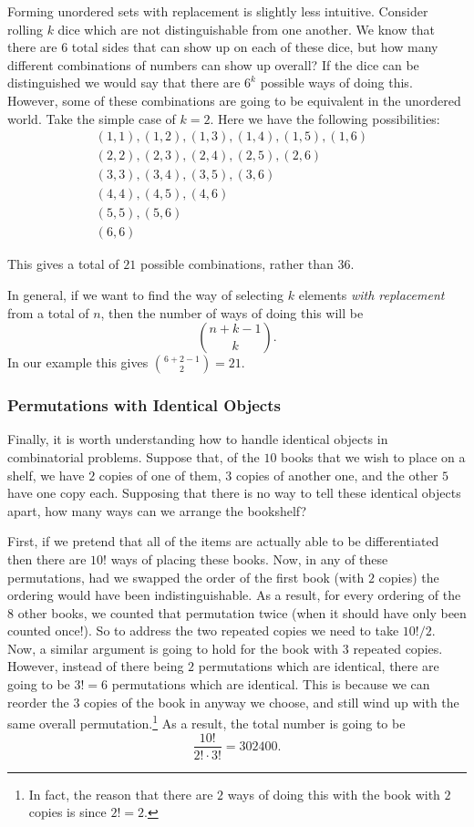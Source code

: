 \documentclass[
  letterpaper,
  DIV=11,
  numbers=noendperiod]{scrreprt}
\theoremstyle{definition}
\theoremstyle{definition}
\theoremstyle{definition}
\theoremstyle{remark}
\begin{document}
Forming unordered sets with replacement is slightly less intuitive.
Consider rolling \(k\) dice which are not distinguishable from one
another. We know that there are \(6\) total sides that can show up on
each of these dice, but how many different combinations of numbers can
show up overall? If the dice can be distinguished we would say that
there are \(6^k\) possible ways of doing this. However, some of these
combinations are going to be equivalent in the unordered world. Take the
simple case of \(k=2\). Here we have the following possibilities:
\begin{align*}
(1, 1), (1, 2), (1, 3), (1, 4), (1, 5), (1, 6)&\\ 
(2, 2), (2, 3), (2, 4), (2, 5), (2, 6)&\\ 
(3, 3), (3, 4), (3, 5), (3, 6)&\\ 
(4, 4), (4, 5), (4, 6)&\\ 
(5, 5), (5, 6)&\\ 
(6,6)&
\end{align*}

This gives a total of \(21\) possible combinations, rather than \(36\).

In general, if we want to find the way of selecting \(k\) elements
\emph{with replacement} from a total of \(n\), then the number of ways
of doing this will be \[\binom{n+k-1}{k}.\] In our example this gives
\(\binom{6+2-1}{2} = 21\).

\subsubsection{Permutations with Identical
Objects}\label{permutations-with-identical-objects}

Finally, it is worth understanding how to handle identical objects in
combinatorial problems. Suppose that, of the \(10\) books that we wish
to place on a shelf, we have \(2\) copies of one of them, \(3\) copies
of another one, and the other \(5\) have one copy each. Supposing that
there is no way to tell these identical objects apart, how many ways can
we arrange the bookshelf?

First, if we pretend that all of the items are actually able to be
differentiated then there are \(10!\) ways of placing these books. Now,
in any of these permutations, had we swapped the order of the first book
(with \(2\) copies) the ordering would have been indistinguishable. As a
result, for every ordering of the \(8\) other books, we counted that
permutation twice (when it should have only been counted once!). So to
address the two repeated copies we need to take \(10!/2\). Now, a
similar argument is going to hold for the book with \(3\) repeated
copies. However, instead of there being \(2\) permutations which are
identical, there are going to be \(3! = 6\) permutations which are
identical. This is because we can reorder the \(3\) copies of the book
in anyway we choose, and still wind up with the same overall
permutation.\footnote{In fact, the reason that there are \(2\) ways of
  doing this with the book with \(2\) copies is since \(2! = 2\).} As a
result, the total number is going to be
\[\frac{10!}{2!\cdot3!} = 302400.\]
\end{document}
